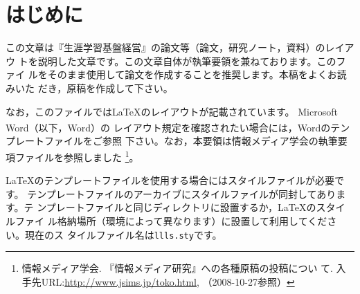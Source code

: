 \documentclass[b5paper,10pt,twocolumn,tombow]{jarticle}
\begin{document}
\tableofcontents{}
\bigskip{}

\section{はじめに}
この文章は『生涯学習基盤経営』の論文等（論文，研究ノート，資料）のレイアウ
トを説明した文章です。この文章自体が執筆要領を兼ねております。このファイ
ルをそのまま使用して論文を作成することを推奨します。本稿をよくお読みいた
だき，原稿を作成して下さい。


なお，このファイルでは\LaTeX{}のレイアウトが記載されています。
Microsoft Word\textsuperscript{\textregistered}（以下，Word）の
レイアウト規定を確認されたい場合には，Wordのテンプレートファイルをご参照
下さい。なお，本要領は情報メディア学会の執筆要項ファイルを参照しました
\footnote{情報メディア学会. 『情報メディア研究』への各種原稿の投稿につい
て. 入手先URL:\url{http://www.jsims.jp/toko.html}, （2008-10-27参照）}。

\LaTeX{}のテンプレートファイルを使用する場合にはスタイルファイルが必要です。
テンプレートファイルのアーカイブにスタイルファイルが同封してあります。テ
ンプレートファイルと同じディレクトリに設置するか，\LaTeX{}のスタイルファイ
ル格納場所（環境によって異なります）に設置して利用してください。現在のス
タイルファイル名は\texttt{llls.sty}です。
\end{document}
